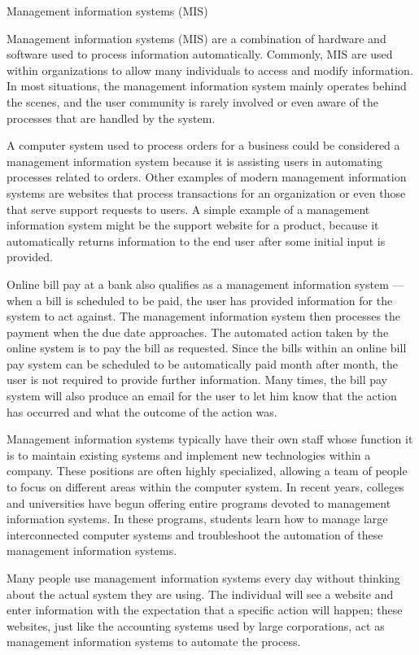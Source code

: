 Management information systems (MIS) 

Management information systems (MIS) are a combination of hardware and software used to process information automatically. Commonly, MIS are used within organizations to allow many individuals to access and modify information. In most situations, the management information system mainly operates behind the scenes, and the user community is rarely involved or even aware of the processes that are handled by the system.


A computer system used to process orders for a business could be considered a management information system because it is assisting users in automating processes related to orders. Other examples of modern management information systems are websites that process transactions for an organization or even those that serve support requests to users. A simple example of a management information system might be the support website for a product, because it automatically returns information to the end user after some initial input is provided.


Online bill pay at a bank also qualifies as a management information system — when a bill is scheduled to be paid, the user has provided information for the system to act against. The management information system then processes the payment when the due date approaches. The automated action taken by the online system is to pay the bill as requested. Since the bills within an online bill pay system can be scheduled to be automatically paid month after month, the user is not required to provide further information. Many times, the bill pay system will also produce an email for the user to let him know that the action has occurred and what the outcome of the action was.


Management information systems typically have their own staff whose function it is to maintain existing systems and implement new technologies within a company. These positions are often highly specialized, allowing a team of people to focus on different areas within the computer system. In recent years, colleges and universities have begun offering entire programs devoted to management information systems. In these programs, students learn how to manage large interconnected computer systems and troubleshoot the automation of these management information systems.


Many people use management information systems every day without thinking about the actual system they are using. The individual will see a website and enter information with the expectation that a specific action will happen; these websites, just like the accounting systems used by large corporations, act as management information systems to automate the process.


